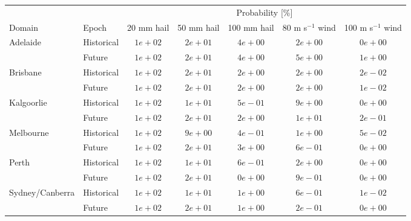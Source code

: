 \begin{tabular}{llccccc}
\hline
& & \multicolumn{5}{c}{Probability [\%]} \\ 
Domain & Epoch & 20 mm hail & 50 mm hail & 100 mm hail & 80 m s$^{-1}$ wind & \multicolumn{1}{c}{100 m s$^{-1}$ wind} \\ 
\hline
Adelaide & Historical  & $1e+02$ & $2e+01$ & $4e+00$ & $2e+00$ & $0e+00$ \\
 & Future  & $1e+02$ & $2e+01$ & $4e+00$ & $5e+00$ & $1e+00$ \\
Brisbane & Historical  & $1e+02$ & $2e+01$ & $2e+00$ & $2e+00$ & $2e-02$ \\
 & Future  & $1e+02$ & $2e+01$ & $2e+00$ & $2e+00$ & $1e-02$ \\
Kalgoorlie & Historical  & $1e+02$ & $1e+01$ & $5e-01$ & $9e+00$ & $0e+00$ \\
 & Future  & $1e+02$ & $2e+01$ & $2e+00$ & $1e+01$ & $2e-01$ \\
Melbourne & Historical  & $1e+02$ & $9e+00$ & $4e-01$ & $1e+00$ & $5e-02$ \\
 & Future  & $1e+02$ & $2e+01$ & $3e+00$ & $6e-01$ & $0e+00$ \\
Perth & Historical  & $1e+02$ & $1e+01$ & $6e-01$ & $2e+00$ & $0e+00$ \\
 & Future  & $1e+02$ & $2e+01$ & $0e+00$ & $9e-01$ & $0e+00$ \\
Sydney/Canberra & Historical  & $1e+02$ & $1e+01$ & $1e+00$ & $6e-01$ & $1e-02$ \\
 & Future  & $1e+02$ & $2e+01$ & $1e+00$ & $2e-01$ & $0e+00$ \\
\hline 
\end{tabular}
